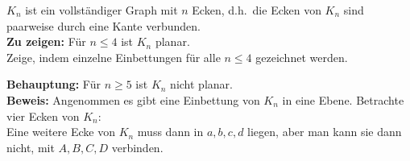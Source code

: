 \begin{problem*}[2a]
  \( K_n \) ist ein vollständiger Graph mit \( n \) Ecken, d.h.\ die Ecken von \( K_n \) sind paarweise durch eine Kante verbunden. \\
  \textbf{Zu zeigen:} Für \( n \leq 4 \) ist \( K_n \) planar. \\
  Zeige, indem einzelne Einbettungen für alle \( n \leq 4 \) gezeichnet werden. \\
\end{problem*}

\begin{problem*}[2b]
  \textbf{Behauptung:} Für \( n \geq 5 \) ist \( K_n \) nicht planar. \\
  \textbf{Beweis:} Angenommen es gibt eine Einbettung von \( K_n \) in eine Ebene. Betrachte vier Ecken von \( K_n \): \\


  Eine weitere Ecke von \( K_n \) muss dann in \( a,b,c,d \) liegen, aber man kann sie dann nicht, mit \( A, B, C, D \) verbinden.
\end{problem*}

